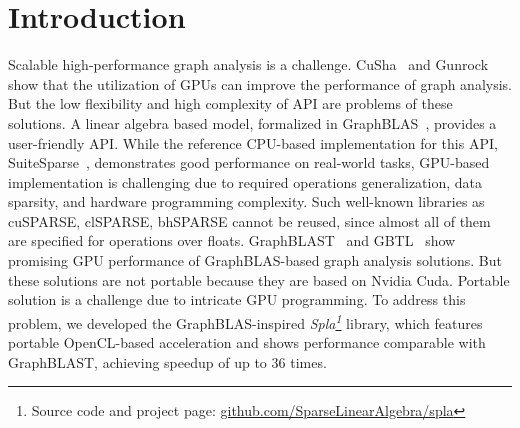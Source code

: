 \section{Introduction}


Scalable high-performance graph analysis is a challenge.
CuSha~\cite{10.1145/2600212.2600227} and Gunrock~\cite{7967137} show that the utilization of GPUs can improve the performance of graph analysis. But the low flexibility and high complexity of API are problems of these solutions. 
A linear algebra based model, formalized in GraphBLAS~\cite{7761646}, provides a user-friendly API. 
While the reference CPU-based implementation for this API, SuiteSparse~\cite{10.1145/3322125}, demonstrates good performance on real-world tasks, GPU-based implementation is challenging due to required operations generalization, data sparsity, and hardware programming complexity. 
Such well-known libraries as cuSPARSE, clSPARSE, bhSPARSE cannot be reused, since almost all of them are specified for operations over floats. 
GraphBLAST~\cite{yang2019graphblast} and GBTL~\cite{7529957} show promising GPU performance of GraphBLAS-based graph analysis solutions. 
But these solutions are not portable because they are based on Nvidia Cuda. 
Portable solution is a challenge due to intricate GPU programming. 
To address this problem, we developed the GraphBLAS-inspired \textit{Spla\footnote{Source code and project page: \url{github.com/SparseLinearAlgebra/spla}}} library, which features portable OpenCL-based acceleration and shows performance comparable with GraphBLAST, achieving speedup of up to 36 times.